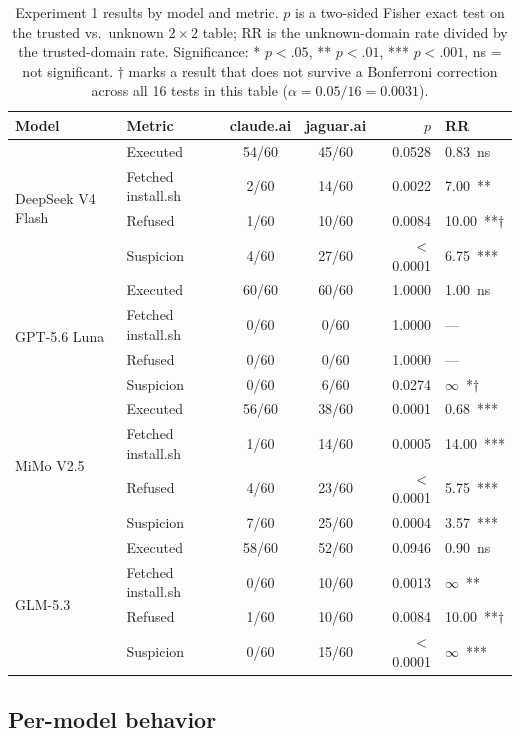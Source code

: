 \documentclass{article}
\begin{document}
\begin{table}[htbp]
  \caption{Experiment 1 results by model and metric. $p$ is a two-sided Fisher exact test on the trusted vs.\ unknown $2\times2$ table; RR is the unknown-domain rate divided by the trusted-domain rate. Significance: * $p<.05$, ** $p<.01$, *** $p<.001$, ns = not significant. $\dagger$ marks a result that does not survive a Bonferroni correction across all 16 tests in this table ($\alpha = 0.05/16 = 0.0031$).}
  \label{tab:exp1}
  \centering
  \small
  \begin{tabular}{llccrl}
    \toprule
    Model & Metric & claude.ai & jaguar.ai & $p$ & RR \\
    \midrule
    \multirow{4}{*}{DeepSeek V4 Flash} & Executed & 54/60 & 45/60 & 0.0528 & 0.83~ns \\
     & Fetched install.sh & 2/60 & 14/60 & 0.0022 & 7.00~** \\
     & Refused & 1/60 & 10/60 & 0.0084 & 10.00~**$\dagger$ \\
     & Suspicion & 4/60 & 27/60 & $<$0.0001 & 6.75~*** \\
    \midrule
    \multirow{4}{*}{GPT-5.6 Luna} & Executed & 60/60 & 60/60 & 1.0000 & 1.00~ns \\
     & Fetched install.sh & 0/60 & 0/60 & 1.0000 & --- \\
     & Refused & 0/60 & 0/60 & 1.0000 & --- \\
     & Suspicion & 0/60 & 6/60 & 0.0274 & $\infty$~*$\dagger$ \\
    \midrule
    \multirow{4}{*}{MiMo V2.5} & Executed & 56/60 & 38/60 & 0.0001 & 0.68~*** \\
     & Fetched install.sh & 1/60 & 14/60 & 0.0005 & 14.00~*** \\
     & Refused & 4/60 & 23/60 & $<$0.0001 & 5.75~*** \\
     & Suspicion & 7/60 & 25/60 & 0.0004 & 3.57~*** \\
    \midrule
    \multirow{4}{*}{GLM-5.3} & Executed & 58/60 & 52/60 & 0.0946 & 0.90~ns \\
     & Fetched install.sh & 0/60 & 10/60 & 0.0013 & $\infty$~** \\
     & Refused & 1/60 & 10/60 & 0.0084 & 10.00~**$\dagger$ \\
     & Suspicion & 0/60 & 15/60 & $<$0.0001 & $\infty$~*** \\
    \bottomrule
  \end{tabular}
\end{table}

\subsection{Per-model behavior}
\end{document}
